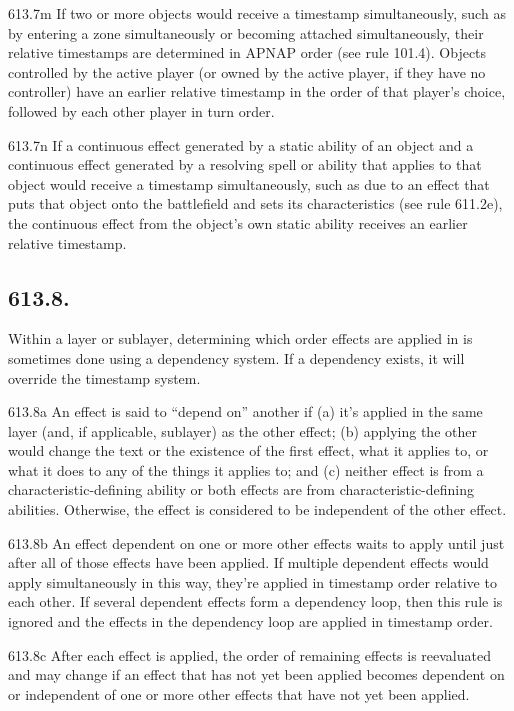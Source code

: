 613.7m If two or more objects would receive a timestamp simultaneously, such as by entering a zone simultaneously or becoming attached simultaneously, their relative timestamps are determined in APNAP order (see rule 101.4). Objects controlled by the active player (or owned by the active player, if they have no controller) have an earlier relative timestamp in the order of that player’s choice, followed by each other player in turn order.

613.7n If a continuous effect generated by a static ability of an object and a continuous effect generated by a resolving spell or ability that applies to that object would receive a timestamp simultaneously, such as due to an effect that puts that object onto the battlefield and sets its characteristics (see rule 611.2e), the continuous effect from the object’s own static ability receives an earlier relative timestamp.

\subsection*{613.8.}
Within a layer or sublayer, determining which order effects are applied in is sometimes done using a dependency system. If a dependency exists, it will override the timestamp system.

613.8a An effect is said to “depend on” another if (a) it’s applied in the same layer (and, if applicable, sublayer) as the other effect; (b) applying the other would change the text or the existence of the first effect, what it applies to, or what it does to any of the things it applies to; and (c) neither effect is from a characteristic-defining ability or both effects are from characteristic-defining abilities. Otherwise, the effect is considered to be independent of the other effect.

613.8b An effect dependent on one or more other effects waits to apply until just after all of those effects have been applied. If multiple dependent effects would apply simultaneously in this way, they’re applied in timestamp order relative to each other. If several dependent effects form a dependency loop, then this rule is ignored and the effects in the dependency loop are applied in timestamp order.

613.8c After each effect is applied, the order of remaining effects is reevaluated and may change if an effect that has not yet been applied becomes dependent on or independent of one or more other effects that have not yet been applied.

